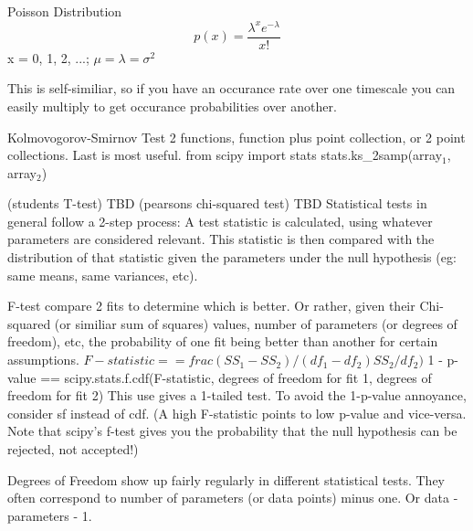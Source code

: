 \documentclass{slides}
\begin{document}
\newpage
Poisson Distribution
\[
p(x) = \frac{\lambda^x e^{-\lambda}}{x!}
\]
x = 0, 1, 2, ...; $\mu = \lambda = \sigma^2$ 

This is self-similiar, so if you have an occurance rate over one timescale you can easily multiply to get occurance probabilities over another.

Kolmovogorov-Smirnov Test
2 functions, function plus point collection, or 2 point collections. Last is most useful.
from scipy import stats 
stats.ks\_2samp(array$_1$, array$_2$)

\newpage
(students T-test) TBD
(pearsons chi-squared test) TBD
Statistical tests in general follow a 2-step process: A test statistic is calculated, using whatever parameters are considered relevant. This statistic is then compared with the distribution of that statistic given the parameters under the null hypothesis (eg: same means, same variances, etc).

\newpage
F-test
compare 2 fits to determine which is better. Or rather, given their Chi-squared (or similiar sum of squares) values, number of parameters (or degrees of freedom), etc, the probability of one fit being better than another for certain assumptions.
$F-statistic == frac{(SS_1 - SS_2)/(df_1-df_2)}{SS_2/df_2)}$
1 - p-value == scipy.stats.f.cdf(F-statistic, degrees of freedom for fit 1, degrees of freedom for fit 2)
This use gives a 1-tailed test. To avoid the 1-p-value annoyance, consider sf instead of cdf.
(A high F-statistic points to low p-value and vice-versa. Note that scipy's f-test gives you the probability that the null hypothesis can be rejected, not accepted!)

Degrees of Freedom show up fairly regularly in different statistical tests. They often correspond to number of parameters (or data points) minus one. Or data - parameters - 1.
\end{document}

